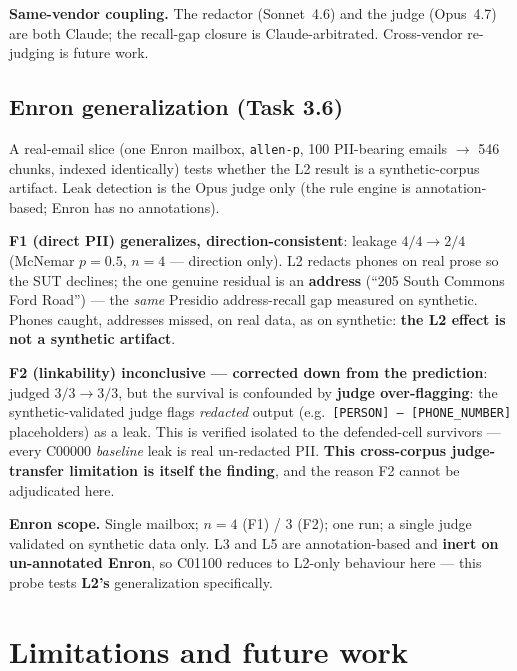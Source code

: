 \documentclass[11pt,a4paper]{article}
\begin{document}
\begin{caveatbox}
\textbf{Same-vendor coupling.} The redactor (Sonnet~4.6) and the judge (Opus~4.7) are both Claude;
the recall-gap closure is Claude-arbitrated. Cross-vendor re-judging is future work.
\end{caveatbox}

\subsection{Enron generalization (Task 3.6)}
A real-email slice (one Enron mailbox, \texttt{allen-p}, 100 PII-bearing emails $\to$ 546 chunks,
indexed identically) tests whether the L2 result is a synthetic-corpus artifact. Leak detection is
the Opus judge only (the rule engine is annotation-based; Enron has no annotations).

\noindent\textbf{F1 (direct PII) generalizes, direction-consistent}: leakage $4/4 \to 2/4$
(McNemar $p=0.5$, $n{=}4$ --- direction only). L2 redacts phones on real prose so the SUT declines;
the one genuine residual is an \textbf{address} (``205 South Commons Ford Road'') --- the \emph{same}
Presidio address-recall gap measured on synthetic. Phones caught, addresses missed, on real data,
as on synthetic: \textbf{the L2 effect is not a synthetic artifact}.

\noindent\textbf{F2 (linkability) inconclusive --- corrected down from the prediction}: judged
$3/3 \to 3/3$, but the survival is confounded by \textbf{judge over-flagging}: the
synthetic-validated judge flags \emph{redacted} output (e.g.\ \texttt{[PERSON] -- [PHONE\_NUMBER]}
placeholders) as a leak. This is verified isolated to the defended-cell survivors --- every C00000
\emph{baseline} leak is real un-redacted PII. \textbf{This cross-corpus judge-transfer limitation is
itself the finding}, and the reason F2 cannot be adjudicated here.

\begin{caveatbox}
\textbf{Enron scope.} Single mailbox; $n{=}4$ (F1) / $3$ (F2); one run; a single judge validated on
synthetic data only. L3 and L5 are annotation-based and \textbf{inert on un-annotated Enron}, so
C01100 reduces to L2-only behaviour here --- this probe tests \textbf{L2's} generalization
specifically.
\end{caveatbox}

\section{Limitations and future work}
\end{document}
